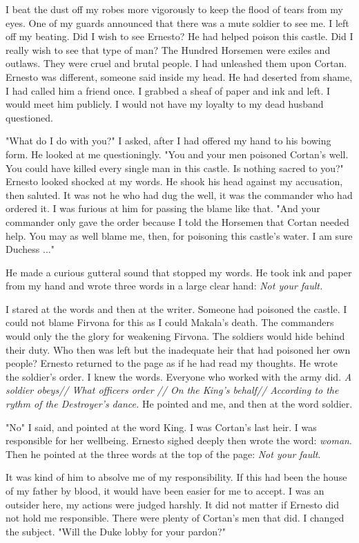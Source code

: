 \documentclass{article}
\begin{document}
I beat the dust off my robes more vigorously to keep the flood of tears from my eyes. One of my guards announced that there was a mute soldier to see me. I left off my beating. Did I wish to see Ernesto? He had helped poison this castle. Did I really wish to see that type of man? The Hundred Horsemen were exiles and outlaws. They were cruel and brutal people. I had unleashed them upon Cortan. Ernesto was different, someone said inside my head. He had deserted from shame, I had called him a friend once. I grabbed a sheaf of paper and ink and left. I would meet him publicly. I would not have my loyalty to my dead husband questioned.

"What do I do with you?" I asked, after I had offered my hand to his bowing form. He looked at me questioningly. "You and your men poisoned Cortan's well. You could have killed every single man in this castle. Is nothing sacred to you?" Ernesto looked shocked at my words. He shook his head against my accusation, then saluted. It was not he who had dug the well, it was the commander who had ordered it. I was furious at him for passing the blame like that. "And your commander only gave the order because I told the Horsemen that Cortan needed help. You may as well blame me, then, for poisoning this castle's water. I am sure Duchess ..." 

He made a curious gutteral sound that stopped my words. He took ink and paper from my hand and wrote three words in a large clear hand: \emph{Not your fault.}

I stared at the words and then at the writer. Someone had poisoned the castle. I could not blame Firvona for this as I could Makala's death. The commanders would only the the glory for weakening Firvona. The soldiers would hide behind their duty. Who then was left but the inadequate heir that had poisoned her own people? Ernesto returned to the page as if he had read my thoughts. He wrote the soldier's order. I knew the words. Everyone who worked with the army did. \emph{A soldier obeys// What officers order // On the King's behalf// According to the rythm of the Destroyer's dance.} He pointed and me, and then at the word soldier.

"No" I said, and pointed at the word King. I was Cortan's last heir. I was responsible for her wellbeing. Ernesto sighed deeply then wrote the word: \emph{woman}. Then he pointed at the three words at the top of the page: \emph{Not your fault}.  

It was kind of him to absolve me of my responsibility. If this had been the house of my father by blood, it would have been easier for me to accept. I was an outsider here, my actions were judged harshly. It did not matter if Ernesto did not hold me responsible. There were plenty of Cortan's men that did. I changed the subject. "Will the Duke lobby for your pardon?"
\end{document}
